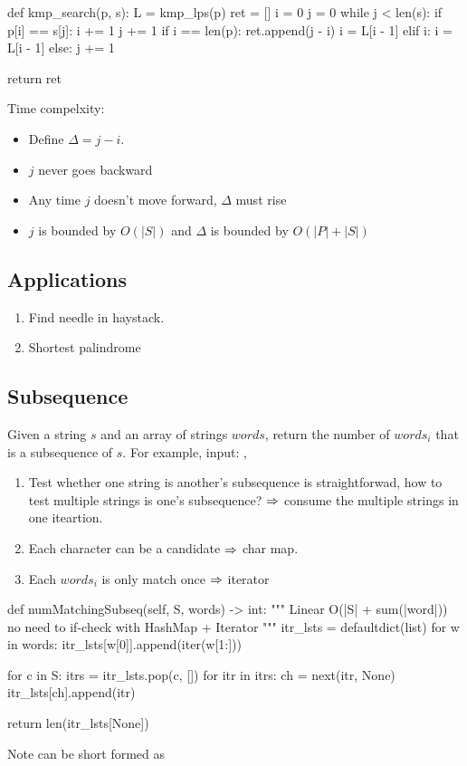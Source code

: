 \begin{python}
def kmp_search(p, s):
    L = kmp_lps(p)
    ret = []
    i = 0
    j = 0
    while j < len(s):
        if p[i] == s[j]:
            i += 1
            j += 1
            if i == len(p):
                ret.append(j - i)
                i = L[i - 1]
        elif i:
            i = L[i - 1]
        else:
            j += 1

    return ret
\end{python}
Time compelxity:
\begin{itemize}
\item Define $\Delta = j - i$.
\item $j$ never goes backward
\item Any time $j$ doesn’t move forward, $\Delta$ must rise
\item $j$ is bounded by $O(|S|)$ and $\Delta$ is bounded by $O(|P|+|S|)$
\end{itemize}
\subsection{Applications}
\begin{enumerate}
\item Find needle in haystack. 
\item Shortest palindrome 
\end{enumerate}
\subsection{Subsequence}
Given a string $s$ and an array of strings $words$, return the number of $words_i$ that is a subsequence of $s$. For example, input: , 

\begin{enumerate}
\item Test whether one string is another's subsequence is straightforwad, how to test multiple strings is one's subsequence? $\Rightarrow$ consume the multiple strings in one iteartion. 
\item Each character can be a candidate $\Rightarrow$ char map. 
\item Each $words_i$ is only match once $\Rightarrow$ iterator 
\end{enumerate}
\begin{python}
def numMatchingSubseq(self, S, words) -> int:
  """
  Linear O(|S| + sum(|word|)) 
  no need to if-check with HashMap + Iterator 
  """ 
  itr_lsts = defaultdict(list) 
  for w in words: 
    itr_lsts[w[0]].append(iter(w[1:])) 

  for c in S: 
    itrs = itr_lsts.pop(c, []) 
    for itr in itrs: 
      ch = next(itr, None) 
      itr_lsts[ch].append(itr) 
  
  return len(itr_lsts[None])
\end{python}
Note  can be short formed as 

